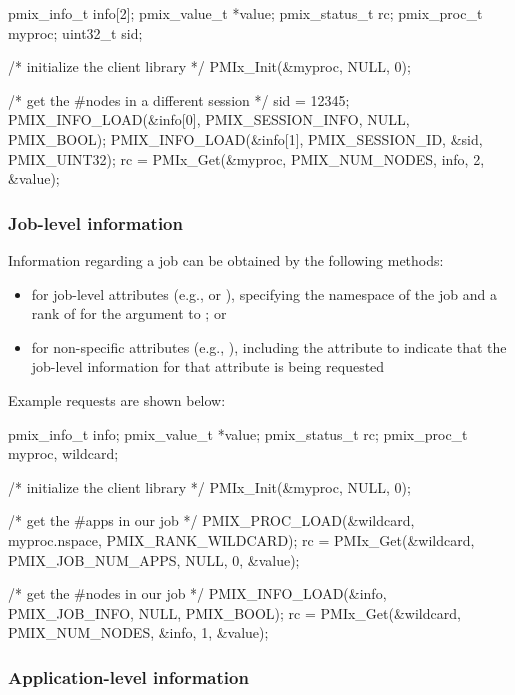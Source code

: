 \cspecificstart
\begin{codepar}
pmix_info_t info[2];
pmix_value_t *value;
pmix_status_t rc;
pmix_proc_t myproc;
uint32_t sid;

/* initialize the client library */
PMIx_Init(&myproc, NULL, 0);

/* get the #nodes in a different session */
sid = 12345;
PMIX_INFO_LOAD(&info[0], PMIX_SESSION_INFO, NULL, PMIX_BOOL);
PMIX_INFO_LOAD(&info[1], PMIX_SESSION_ID, &sid, PMIX_UINT32);
rc = PMIx_Get(&myproc, PMIX_NUM_NODES, info, 2, &value);
\end{codepar}
\cspecificend

\subsubsection{Job-level information}

Information regarding a job can be obtained by the following methods:

\begin{itemize}
\item for job-level attributes (e.g.,  or ), specifying the namespace of the job and a rank of  for the  argument to ; or
\item for non-specific attributes (e.g., ), including the  attribute to indicate that the job-level information for that attribute is being requested
\end{itemize}

Example requests are shown below:

\cspecificstart
\begin{codepar}
pmix_info_t info;
pmix_value_t *value;
pmix_status_t rc;
pmix_proc_t myproc, wildcard;

/* initialize the client library */
PMIx_Init(&myproc, NULL, 0);

/* get the #apps in our job */
PMIX_PROC_LOAD(&wildcard, myproc.nspace, PMIX_RANK_WILDCARD);
rc = PMIx_Get(&wildcard, PMIX_JOB_NUM_APPS, NULL, 0, &value);

/* get the #nodes in our job */
PMIX_INFO_LOAD(&info, PMIX_JOB_INFO, NULL, PMIX_BOOL);
rc = PMIx_Get(&wildcard, PMIX_NUM_NODES, &info, 1, &value);
\end{codepar}
\cspecificend


\subsubsection{Application-level information}

